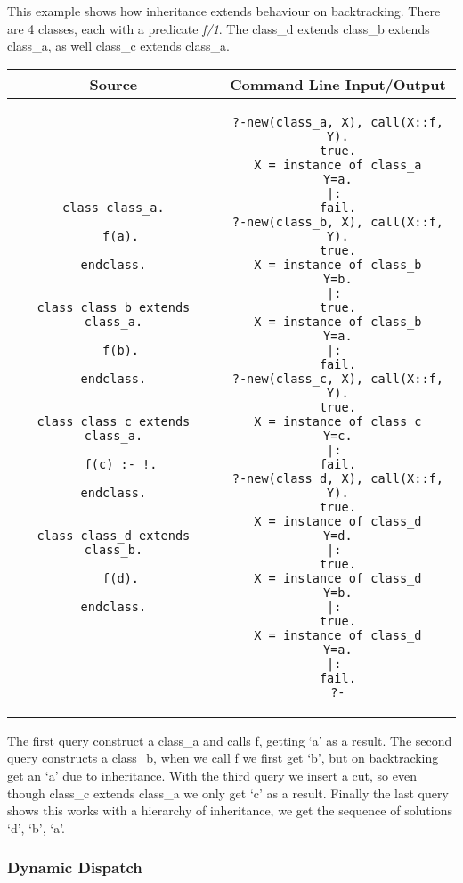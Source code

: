 \documentclass[12pt,a4paper,twoside,openright]{report}
\begin{document}
This example shows how inheritance extends behaviour on backtracking. There are 4 classes, each with a predicate \emph{f/1}. The class_d extends class_b extends class_a, as well class_c extends class_a.
	\begin{center}
\begin{tabular}{c|c}
Source & Command Line Input/Output \\
\hline
	\small
\begin{lstlisting}
class class_a.

  f(a).
  
endclass.


class class_b extends class_a.

  f(b).
  
endclass.


class class_c extends class_a.

  f(c) :- !.
  
endclass.


class class_d extends class_b.

  f(d).
  
endclass.
\end{lstlisting}
&
	\small
\begin{lstlisting}
?-new(class_a, X), call(X::f, Y).
true.
X = instance of class_a
Y=a.
|: 
fail.
?-new(class_b, X), call(X::f, Y).
true.
X = instance of class_b
Y=b.
|: 
true.
X = instance of class_b
Y=a.
|: 
fail.
?-new(class_c, X), call(X::f, Y).
true.
X = instance of class_c
Y=c.
|: 
fail.
?-new(class_d, X), call(X::f, Y).
true.
X = instance of class_d
Y=d.
|: 
true.
X = instance of class_d
Y=b.
|: 
true.
X = instance of class_d
Y=a.
|: 
fail.
?-
\end{lstlisting}
\\
\end{tabular}
\end{center}

The first query construct a class_a and calls f, getting `a' as a result. The second query constructs a class_b, when we call f we first get `b', but on backtracking get an `a' due to inheritance. With the third query we insert a cut, so even though class_c extends class_a we only get `c' as a result. Finally the last query shows this works with a hierarchy of inheritance, we get the sequence of solutions `d', `b', `a'. 

	\subsubsection {Dynamic Dispatch}
	
\end{document}
